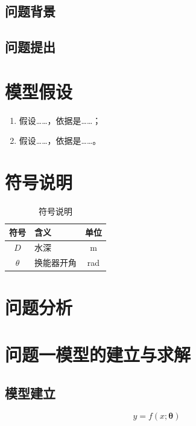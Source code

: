 \documentclass[UTF8,12pt,a4paper,fontset=windows]{ctexart}
\numberwithin{equation}{section}
\newcommand{\symrow}[3]{$#1$ & #2 & #3 \\}
\begin{document}
\subsection{问题背景}
\subsection{问题提出}

\section{模型假设}
\begin{enumerate}[label=(\arabic*),itemsep=2pt]
  \item 假设……，依据是……；
  \item 假设……，依据是……。
\end{enumerate}

\section{符号说明}
\begin{table}[H]\centering\small
\caption{符号说明}
\begin{tabular}{clc}
\toprule
符号 & 含义 & 单位 \\
\midrule
\symrow{D}{水深}{m}
\symrow{\theta}{换能器开角}{rad}
\bottomrule
\end{tabular}
\end{table}

\section{问题分析}

\section{问题一模型的建立与求解}
\subsection{模型建立}
\begin{equation}
  y = f(x;\bm{\theta})
\end{equation}
\end{document}
